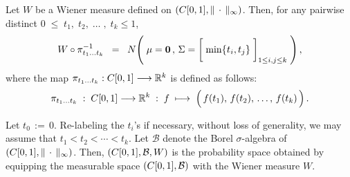 \begin{theorem}
\label{WienerFiniteDimensionalDistributions}
\mbox{}\vskip 0.2cm
\noindent
Let $W$ be a Wiener measure defined on $\left(C[0,1],\Vert\,\cdot\,\Vert_{\infty}\right)$.
Then, for any pairwise distinct \;$0 \;\leq\; t_{1},\; t_{2}, \;\ldots\;,\; t_{k} \leq 1$,
\begin{equation*}
W \circ \pitok^{-1}
\;\; = \;\;
N\!\left(\;
\mathbf{\mu} = \mathbf{0}\,,\,
\Sigma = \left[\;\min\{\overset{{\color{white}1}}{t}_{i},t_{j}\}\;\right]_{1\leq i,j\leq k}
\;\right),
\end{equation*}
where the map \;$\pi_{t_{1}\ldots t_{k}} : C[0,1] \longrightarrow \mathbb{R}^{k}$\; is defined as follows:
\begin{equation*}
\pitok \;:\; \Czo \longrightarrow \Re^{k} \;:\;
f \;\longmapsto\; \left(\,\overset{{\color{white}.}}{f}(t_{1}),\,f(t_{2}),\,\ldots,\,f(t_{k})\,\right).
\end{equation*}
\end{theorem}
\proof
Let $t_{0} \,:= \, 0$.
Re-labeling the $t_{i}$'s if necessary, without loss of generality, we may assume that
$t_{1} < t_{2} < \cdots < t_{k}$.
Let $\mathcal{B}$ denote the Borel $\sigma$-algebra of $\left(C[0,1],\Vert\,\cdot\,\Vert_{\infty}\right)$.
Then, $\left(C[0,1],\mathcal{B},W\right)$ is the probability space
obtained by equipping the measurable space $\left(C[0,1],\mathcal{B}\right)$
with the Wiener measure $W$.

